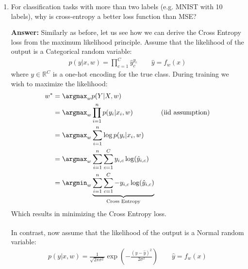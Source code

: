 \documentclass{article}
\newenvironment{QandA}{\begin{enumerate}[label=\arabic*.]}{\end{enumerate}}
\newenvironment{answer}{\par\normalfont \textbf{Answer:}}{}
\newcommand{\R}{\mathbb{R}}
\newcommand{\g}{\vert}
\begin{document}
\begin{QandA}
    \item For classification tasks with more than two labels (e.g. MNIST with 10 labels), why is cross-entropy a better loss function than MSE?
    \begin{answer}
        Similarly as before, let us see how we can derive the Cross Entropy loss from the maximum likelihood principle. Assume that the likelihood of the output is a Categorical random variable:
        \begin{align*}
            p(y \g x, w) = \prod_{c=1}^C \hat{y}_c^{y_c} \quad\quad \hat{y} = f_w(x)
        \end{align*}
        where $y \in \R^C$ is a one-hot encoding for the true class. During training we wish to maximize the likelihood:
        \begin{align*}
            w^* &= \argmax_{w} p(Y \g X, w) \\
            &= \argmax_{w} \prod_{i=1}^n p(y_i \g x_i, w) &\text{(iid assumption)} \\
            &= \argmax_{w} \sum_{i=1}^n \log p(y_i \g x_i, w) \\
            &= \argmax_{w} \sum_{i=1}^n \sum_{c=1}^C y_{i, c} \log (\hat{y}_{i, c}) \\
            &= \argmin_{w} \underbrace{\sum_{i=1}^n \sum_{c=1}^C - y_{i, c} \log (\hat{y}_{i, c})}_{\text{Cross Entropy}}
        \end{align*}
        Which results in minimizing the Cross Entropy loss. \\\\
        In contrast, now assume that the likelihood of the output is a Normal random variable:
        \begin{align*}
            p(y \g x, w) = \frac{1}{\sqrt{2\pi \sigma^2}} \exp \left ( -\frac{(y - \hat{y})^2}{2\sigma^2} \right) \quad \quad \hat{y} = f_w(x)
        \end{align*}
        

\end{answer}
\end{QandA}
\end{document}
